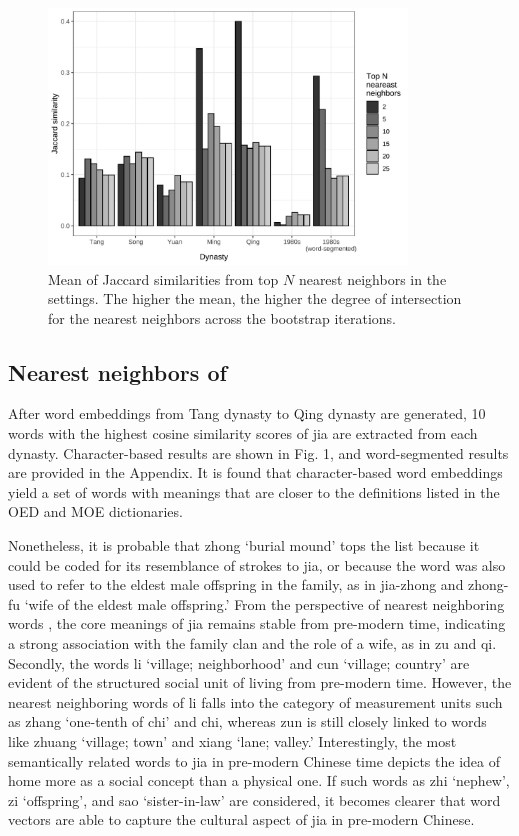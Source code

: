 \begin{figure}[H]
  \centering
  \includegraphics[width=0.85\textwidth,keepaspectratio]{figures_new/bootstrap_for_stability/jaccard_similarity_grey.pdf}
  \caption{Mean of Jaccard similarities from top $N$ nearest neighbors in the  settings. The higher the mean, the higher the degree of intersection for the nearest neighbors across the bootstrap iterations.} \label{fig:stability_jaccard}
\end{figure}

\subsection{Nearest neighbors of \jia}
After word embeddings from Tang dynasty to Qing dynasty are generated, 10 words with the highest cosine similarity scores of jia are extracted from each dynasty. Character-based results are shown in Fig. 1, and word-segmented results are provided in the Appendix. It is found that character-based word embeddings yield a set of words with meanings that are closer to the definitions listed in the OED and MOE dictionaries.

Nonetheless, it is probable that zhong `burial mound' tops the list because it could be coded for its resemblance of strokes to jia, or because the word was also used to refer to the eldest male offspring in the family, as in jia-zhong and zhong-fu `wife of the eldest male offspring.' From the perspective of nearest neighboring words \parencite{hamilton2016cultural}, the core meanings of jia remains stable from pre-modern time, indicating a strong association with the family clan and the role of a wife, as in zu and qi. Secondly, the words li `village; neighborhood' and cun `village; country' are evident of the structured social unit of living from pre-modern time. However, the nearest neighboring words of li falls into the category of measurement units such as zhang `one-tenth of chi' and chi, whereas zun is still closely linked to words like zhuang `village; town' and xiang `lane; valley.' Interestingly, the most semantically related words to jia in pre-modern Chinese time depicts the idea of home more as a social concept than a physical one. If such words as zhi `nephew', zi `offspring', and sao `sister-in-law' are considered, it becomes clearer that word vectors are able to capture the cultural aspect of jia in pre-modern Chinese. 

